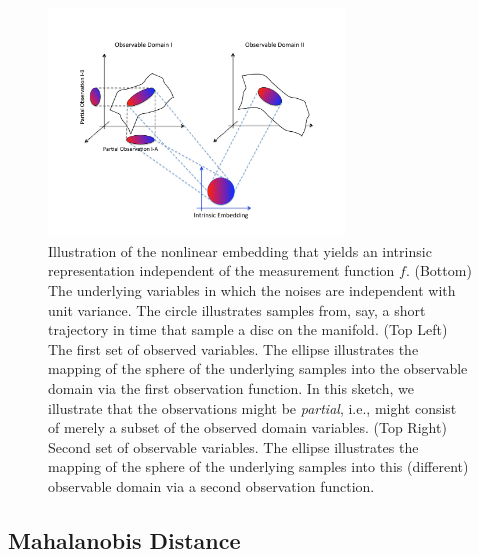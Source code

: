 \documentclass[aip,jcp,preprint]{revtex4-1}
\begin{document}
\begin{figure}[ht]
\includegraphics[width=0.7\textwidth]{IntrinsicEmbeddingIllustration2}
\caption{Illustration of the nonlinear embedding that yields an intrinsic representation independent of the measurement function $f$. (Bottom) The underlying variables in which the noises are independent with unit variance. The circle illustrates samples from, say, a short trajectory in time that sample a disc on the manifold. (Top Left) The first set of observed variables. The ellipse illustrates the mapping of the sphere of the underlying samples into the observable domain via the first observation function. In this sketch, we illustrate that the observations might be {\em partial}, i.e., might consist of merely a subset of the observed domain variables. (Top Right) Second set of observable variables. The ellipse illustrates the mapping of the sphere of the underlying samples into this (different) observable domain via a second observation function.}
\label{fig:IntrinsicIllustration}
\end{figure}

\subsection{Mahalanobis Distance}
\label{subsec:mahalanobis}
\end{document}
